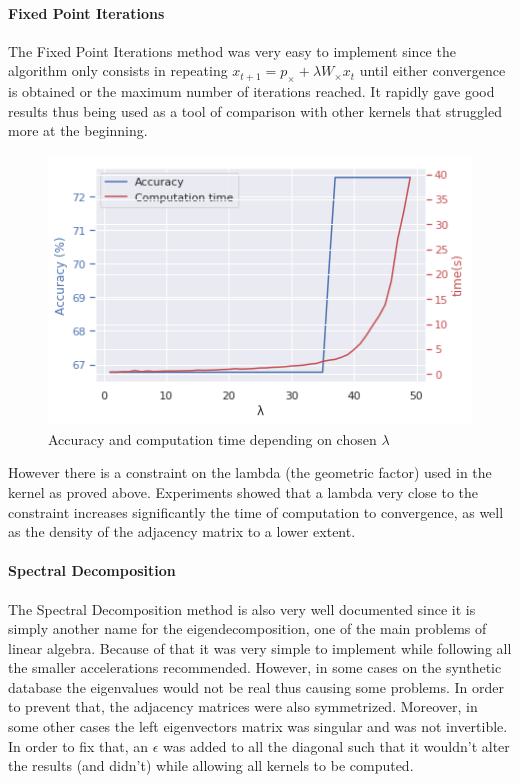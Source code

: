 \documentclass{article}
\theoremstyle{definition}
\begin{document}
\paragraph{Fixed Point Iterations}
The Fixed Point Iterations method was very easy to implement since the algorithm only consists in repeating $x_{t+1}=p_{\times}+\lambda W_{\times}x_t$ until either convergence is obtained or the maximum number of iterations reached. It rapidly gave good results thus being used as a tool of comparison with other kernels that struggled more at the beginning.
\begin{figure}[!htb]
	\centering
	\includegraphics[width=0.7\linewidth]{data/fixed_point/acc_comp_time_fct_lambda.png}
	\caption{Accuracy and computation time depending on chosen $\lambda$}
\end{figure}
However there is a constraint on the lambda (the geometric factor) used in the kernel as proved above. Experiments showed that a lambda very close to the constraint increases significantly the time of computation to convergence, as well as the density of the adjacency matrix to a lower extent.

\paragraph{Spectral Decomposition}
The Spectral Decomposition method is also very well documented since it is simply another name for the eigendecomposition, one of the main problems of linear algebra. Because of that it was very simple to implement while following all the smaller accelerations recommended. However, in some cases on the synthetic database the eigenvalues would not be real thus causing some problems. In order to prevent that, the adjacency matrices were also symmetrized. Moreover, in some other cases the left eigenvectors matrix was singular and was not invertible. In order to fix that, an $\epsilon$ was added to all the diagonal such that it wouldn't alter the results (and didn't) while allowing all kernels to be computed.
\end{document}
